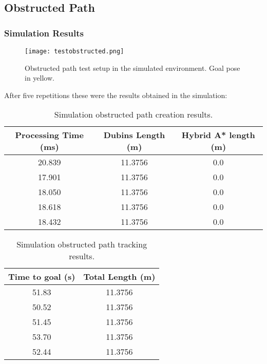 \subsection{Obstructed Path}
\label{subsec:obstructed_path}
\subsubsection{Simulation Results}

\begin{figure}[h]
    \centering
    \texttt{[image: testobstructed.png]}
    \caption{Obstructed path test setup in the simulated environment. Goal pose in yellow.}
    \label{fig:obstructed_path}
\end{figure}

After five repetitions these were the results obtained in the simulation:

\begin{table}[H]
    \centering
    \begin{tabular}{|c|c|c|}
        \hline
        \textbf{Processing Time (ms)} & \textbf{Dubins Length (m)} & \textbf{Hybrid A* length (m)} \\
        \hline
         20.839 & 11.3756 & 0.0 \\
        \hline
         17.901 & 11.3756 & 0.0 \\
         \hline
         18.050 & 11.3756 & 0.0 \\
         \hline
         18.618 & 11.3756 & 0.0 \\
         \hline
         18.432 & 11.3756 & 0.0 \\
         \hline
    \end{tabular}
    \caption{Simulation obstructed path creation results.}
    \label{tab:obstructed_path_results1}
\end{table}
\begin{table}[H]
    \centering
    \begin{tabular}{|c|c|}
        \hline
        \textbf{Time to goal (s)} & \textbf{Total Length (m)} \\
         \hline
         51.83 & 11.3756 \\
         \hline
         50.52 & 11.3756 \\
         \hline
         51.45 & 11.3756 \\
         \hline
         53.70 & 11.3756 \\
         \hline
         52.44 & 11.3756 \\
         \hline
    \end{tabular}
    \caption{Simulation obstructed path tracking results.}
    \label{tab:obstructed_path_results2}
\end{table}
\clearpage

